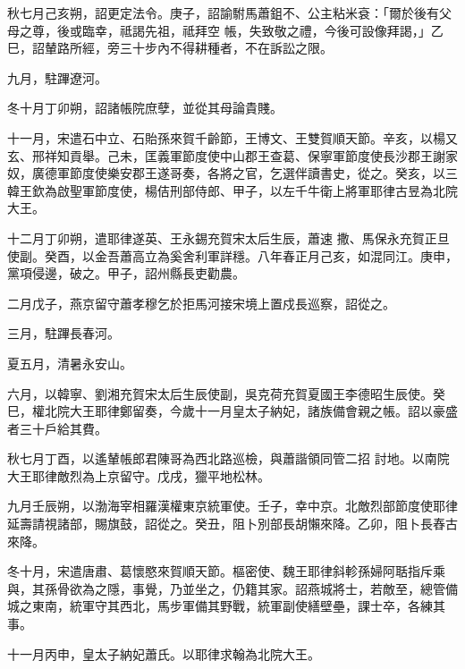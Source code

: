 \begin{pinyinscope}
 秋七月己亥朔，詔更定法令。庚子，詔諭駙馬蕭鉏不、公主粘米袞：「爾於後有父母之尊，後或臨幸，祗謁先祖，祗拜空
 帳，失致敬之禮，今後可設像拜謁，」乙巳，詔輦路所經，旁三十步內不得耕種者，不在訴訟之限。



 九月，駐蹕遼河。



 冬十月丁卯朔，詔諸帳院庶孽，並從其母論貴賤。



 十一月，宋遣石中立、石貽孫來賀千齡節，王博文、王雙賀順天節。辛亥，以楊又玄、邢祥知貢舉。己未，匡義軍節度使中山郡王查葛、保寧軍節度使長沙郡王謝家奴，廣德軍節度使樂安郡王遂哥奏，各將之官，乞選伴讀書史，從之。癸亥，以三韓王欽為啟聖軍節度使，楊佶刑部侍郎、甲子，以左千牛衛上將軍耶律古昱為北院大王。



 十二月丁卯朔，遣耶律遂英、王永錫充賀宋太后生辰，蕭速
 撒、馬保永充賀正旦使副。癸酉，以金吾蕭高立為奚舍利軍詳穩。八年春正月己亥，如混同江。庚申，黨項侵邊，破之。甲子，詔州縣長吏勸農。



 二月戊子，燕京留守蕭孝穆乞於拒馬河接宋境上置戍長巡察，詔從之。



 三月，駐蹕長春河。



 夏五月，清暑永安山。



 六月，以韓寧、劉湘充賀宋太后生辰使副，吳克荷充賀夏國王李德昭生辰使。癸巳，權北院大王耶律鄭留奏，今歲十一月皇太子納妃，諸族備會親之帳。詔以豪盛者三十戶給其費。



 秋七月丁酉，以遙輦帳郎君陳哥為西北路巡檢，與蕭諧領同管二招
 討地。以南院大王耶律敵烈為上京留守。戊戌，獵平地松林。



 九月壬辰朔，以渤海宰相羅漢權東京統軍使。壬子，幸中京。北敵烈部節度使耶律延壽請視諸部，賜旗鼓，詔從之。癸丑，阻卜別部長胡懶來降。乙卯，阻卜長舂古來降。



 冬十月，宋遣唐肅、葛懷愍來賀順天節。樞密使、魏王耶律斜軫孫婦阿聒指斥乘與，其孫骨欲為之隱，事覺，乃並坐之，仍籍其家。詔燕城將士，若敵至，總管備城之東南，統軍守其西北，馬步軍備其野戰，統軍副使繕壁壘，課士卒，各練其事。



 十一月丙申，皇太子納妃蕭氏。以耶律求翰為北院大王。




\end{pinyinscope}
